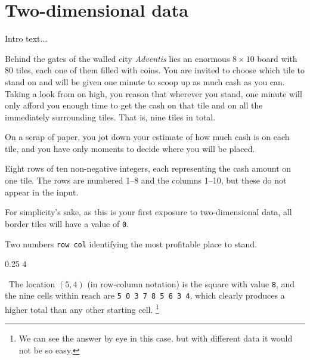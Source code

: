 
\chapter{Two-dimensional data}

Intro text...


\clearpage


Behind the gates of the walled city \emph{Adventis} lies an enormous $8 \times 10$ board
with 80 tiles, each one of them filled with coins. You are invited to choose which tile
to stand on and will be given one minute to scoop up as much cash as you can. Taking a
look from on high, you reason that wherever you stand, one minute will only afford you
enough time to get the cash on that tile and on all the immediately surrounding tiles.
That is, nine tiles in total.

On a scrap of paper, you jot down your estimate of how much cash is on each tile, and you
have only moments to decide where you will be placed.

\Input Eight rows of ten non-negative integers, each representing the cash amount on one
tile. The rows are numbered 1--8 and the columns 1--10, but these do not appear in the input.

For simplicity's sake, as this is your first exposure to two-dimensional data, all border
tiles will have a value of \texttt{0}.

\Output Two numbers \texttt{row col} identifying the most profitable place to stand.

\Sample

       {0.2}{5 4}

\Explanation\ The location $(5,4)$ (in row-column notation) is the square with value
\texttt{8}, and the nine cells within reach are \texttt{5 0 3 7 8 5 6 3 4}, which clearly
produces a higher total than any other starting cell.%
\footnote{We can see the answer by eye in this case, but with different data it would not
be so easy.}

